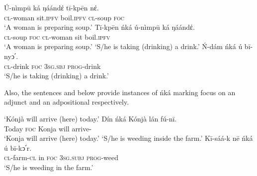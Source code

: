 \documentclass[output=paper,colorlinks,citecolor=brown]{langscibook}
\begin{document}
\ea%
    \label{ex:bisilki:13}
    \ea\label{ex:bisilki:13a}
    \gll    Ú-nìmpū	ká		ŋáándέ	tī-kpēn	nέ.\\
            \textsc{cl-}woman	sit\textsc{.ipfv}	boil\textsc{.ipfv}	\textsc{cl-}soup	\textsc{foc}\\
    \glt    ‘A woman is preparing soup.’
    \ex\label{ex:bisilki:13b}
    \gll    Tī-kpēn	ńká	ú-nìmpū	ká	ŋáándέ.\\
            \textsc{cl-}soup	\textsc{foc}	\textsc{cl-}woman	sit	boil\textsc{.ipfv}\\
    \glt    ‘A woman is preparing soup.’
    \jambox*{[canonical]}
    \glt    ‘S/he is taking (drinking) a drink.’
    \ex\label{ex:bisilki:13d}
    \gll    Ń-dám	ńká	ú		bī-nyↄ՛.\\
            \textsc{cl-}drink	\textsc{foc}	\textsc{3sg.sbj}	\textsc{prog-}drink\\
    \glt    ‘S/he is taking (drinking) a drink.’
    \z
\z

Also, the sentences  and  below provide instances of ńká marking focus on an adjunct and an adpositional respectively.

\ea%
    \label{ex:bisilki:14}
    \jambox*{[canonical]}
    \glt    ‘Kónjà will arrive (here) today.’
    \ex\label{ex:bisilki:14b}
    \gll    Dín		ńká	Kónjà		lán	fú-nī.\\
            Today		\textsc{foc}	Konja		will	arrive-\\
    \glt    ‘Konja will arrive (here) today.’
    \glt    ‘S/he is weeding inside the farm.’
    \ex\label{ex:bisilki:14d}
    \gll    Kī-sáá-k	nē	ńká	ú		bī-kↄ՛r.\\
            \textsc{cl-}farm\textsc{-cl}	in	\textsc{foc}	\textsc{3sg.subj}	\textsc{prog-}weed\\
    \glt    ‘S/he is weeding in the farm.’
    \z
\z
\end{document}
